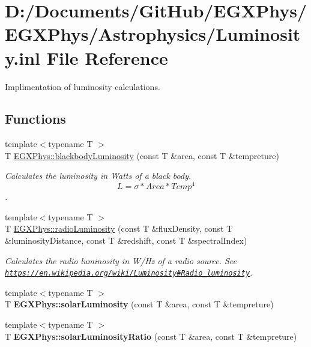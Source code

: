 \hypertarget{_luminosity_8inl}{}\section{D\+:/\+Documents/\+Git\+Hub/\+E\+G\+X\+Phys/\+E\+G\+X\+Phys/\+Astrophysics/\+Luminosity.inl File Reference}
\label{_luminosity_8inl}


Implimentation of luminosity calculations.  


\subsection*{Functions}
\begin{DoxyCompactItemize}
\item 
{\footnotesize template$<$typename T $>$ }\\T \hyperlink{_luminosity_8hpp_a909f82edfaed449b44e94788b642ebb8}{E\+G\+X\+Phys\+::blackbody\+Luminosity} (const T \&area, const T \&tempreture)
\begin{DoxyCompactList}\small\item\em Calculates the luminosity in Watts of a black body. \[L=\sigma*Area*Temp^4\]. \end{DoxyCompactList}\item 
{\footnotesize template$<$typename T $>$ }\\T \hyperlink{_luminosity_8hpp_a6d6865b2aac1bc7c7f06b7c4ac2444e4}{E\+G\+X\+Phys\+::radio\+Luminosity} (const T \&flux\+Density, const T \&luminosity\+Distance, const T \&redshift, const T \&spectral\+Index)
\begin{DoxyCompactList}\small\item\em Calculates the radio luminosity in W/\+Hz of a radio source. See \href{https://en.wikipedia.org/wiki/Luminosity#Radio_luminosity}{\tt https\+://en.\+wikipedia.\+org/wiki/\+Luminosity\#\+Radio\+\_\+luminosity}. \end{DoxyCompactList}\item 
\mbox{\label{_luminosity_8inl_ade3d05c9dcd810cb5290375d11587b6a}} 
{\footnotesize template$<$typename T $>$ }\\T {\bfseries E\+G\+X\+Phys\+::solar\+Luminosity} (const T \&area, const T \&tempreture)
\item 
\mbox{\label{_luminosity_8inl_ac5e66686d7910587e3636b7984d466e9}} 
{\footnotesize template$<$typename T $>$ }\\T {\bfseries E\+G\+X\+Phys\+::solar\+Luminosity\+Ratio} (const T \&area, const T \&tempreture)
\end{DoxyCompactItemize}


